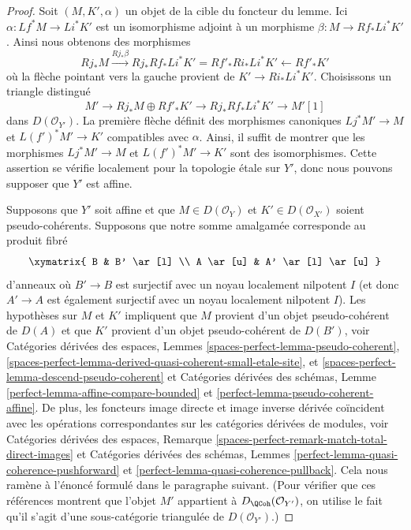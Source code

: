 \begin{proof}
Soit $(M, K', \alpha)$ un objet de la cible du foncteur
du lemme. Ici $\alpha : Lf^*M \to Li^*K'$
est un isomorphisme adjoint à un morphisme $\beta : M \to Rf_*Li^*K'$.
Ainsi nous obtenons des morphismes
$$
Rj_*M \xrightarrow{Rj_*\beta}
Rj_*Rf_*Li^*K' = Rf'_*Ri_*Li^*K' \leftarrow Rf'_*K'
$$
où la flèche pointant vers la gauche provient de $K' \to Ri_*Li^*K'$.
Choisissons un triangle distingué
$$
M' \to Rj_*M \oplus Rf'_*K' \to Rj_*Rf_*Li^*K' \to M'[1]
$$
dans $D(\mathcal{O}_{Y'})$. La première flèche définit des morphismes canoniques
$Lj^*M' \to M$ et $L(f')^*M' \to K'$ compatibles avec $\alpha$.
Ainsi, il suffit de montrer que les morphismes
$Lj^*M' \to M$ et $L(f')^*M' \to K'$ sont des isomorphismes.
Cette assertion se vérifie localement pour la topologie \'etale sur $Y'$, donc nous pouvons
supposer que $Y'$ est affine.

\medskip\noindent
Supposons que $Y'$ soit affine et que $M \in D(\mathcal{O}_Y)$
et $K' \in D(\mathcal{O}_{X'})$ soient pseudo-cohérents.
Supposons que notre somme amalgamée corresponde au produit fibré
$$
\xymatrix{
B & B' \ar[l] \\
A \ar[u] & A' \ar[l] \ar[u]
}
$$
d'anneaux où $B' \to B$ est surjectif avec un noyau localement nilpotent $I$
(et donc $A' \to A$ est également surjectif avec un noyau localement nilpotent $I$).
Les hypothèses sur $M$ et $K'$ impliquent que $M$ provient d'un objet pseudo-cohérent de $D(A)$ et que $K'$ provient d'un objet pseudo-cohérent de $D(B')$, voir
Catégories dérivées des espaces, Lemmes
\ref{spaces-perfect-lemma-pseudo-coherent},
\ref{spaces-perfect-lemma-derived-quasi-coherent-small-etale-site}, et
\ref{spaces-perfect-lemma-descend-pseudo-coherent}
et
Catégories dérivées des schémas, Lemme
\ref{perfect-lemma-affine-compare-bounded} et
\ref{perfect-lemma-pseudo-coherent-affine}.
De plus, les foncteurs image directe et image inverse dérivée coïncident avec les
opérations correspondantes sur les catégories dérivées de modules, voir Catégories dérivées des espaces, Remarque
\ref{spaces-perfect-remark-match-total-direct-images}
et
Catégories dérivées des schémas, Lemmes
\ref{perfect-lemma-quasi-coherence-pushforward} et
\ref{perfect-lemma-quasi-coherence-pullback}.
Cela nous ramène à l'énoncé formulé dans le paragraphe suivant.
(Pour vérifier que ces références montrent que l'objet $M'$ appartient à
$D_\QCoh(\mathcal{O}_{Y'})$, on utilise le fait qu'il s'agit d'une
sous-catégorie triangulée de $D(\mathcal{O}_{Y'})$.)


\end{proof}
